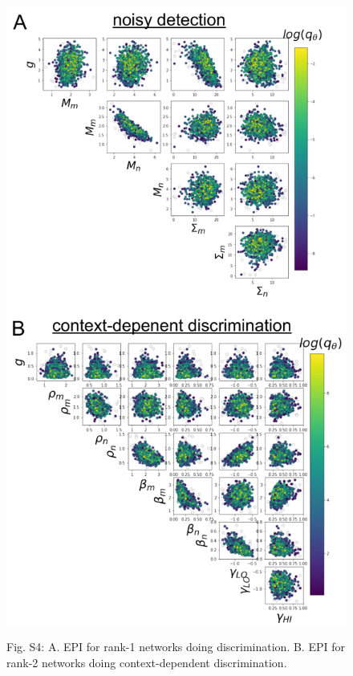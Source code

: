 \documentclass[11pt]{article}
\begin{document}
\begin{figure}
\begin{center}
\includegraphics[scale=0.5]{figs/figS4/figS4.pdf}
\end{center}
Fig. S4: A. EPI for rank-1 networks doing discrimination. B. EPI for rank-2 networks doing context-dependent discrimination.
\end{figure}
\end{document}
